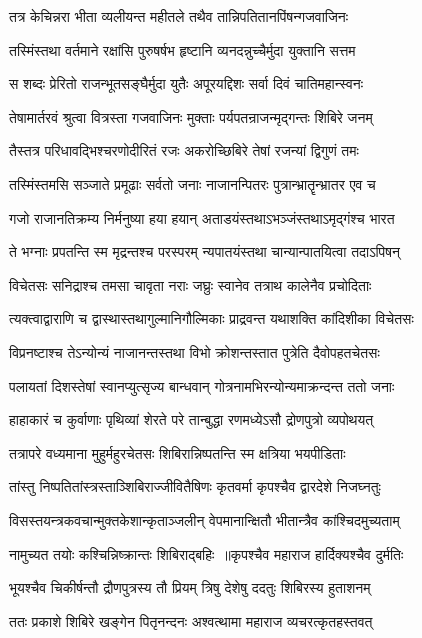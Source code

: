 \twolineshloka
{तत्र केचिन्नरा भीता व्यलीयन्त महीतले}
{तथैव तान्निपतितानपिंषन्गजवाजिनः}


\twolineshloka
{तस्मिंस्तथा वर्तमाने रक्षांसि पुरुषर्षभ}
{हृष्टानि व्यनदन्नुच्चैर्मुदा युक्तानि सत्तम}


\twolineshloka
{स शब्दः प्रेरितो राजन्भूतसङ्घैर्मुदा युतैः}
{अपूरयद्दिशः सर्वा दिवं चातिमहान्स्वनः}


\twolineshloka
{तेषामार्तरवं श्रुत्वा वित्रस्ता गजवाजिनः}
{मुक्ताः पर्यपतन्राजन्मृद्गन्तः शिबिरे जनम्}


\twolineshloka
{तैस्तत्र परिधावद्भिश्चरणोदीरितं रजः}
{अकरोच्छिबिरे तेषां रजन्यां द्विगुणं तमः}


\twolineshloka
{तस्मिंस्तमसि सञ्जाते प्रमूढाः सर्वतो जनाः}
{नाजानन्पितरः पुत्रान्भ्रातॄन्भ्रातर एव च}


\twolineshloka
{गजो राजानतिक्रम्य निर्मनुष्या हया हयान्}
{अताडयंस्तथाऽभञ्जंस्तथाऽमृद्गंश्च भारत}


\twolineshloka
{ते भग्नाः प्रपतन्ति स्म मृद्रन्तश्च परस्परम्}
{न्यपातयंस्तथा चान्यान्पातयित्वा तदाऽपिषन्}


\twolineshloka
{विचेतसः सनिद्राश्च तमसा चावृता नराः}
{जघ्रुः स्वानेव तत्राथ कालेनैव प्रचोदिताः}


\twolineshloka
{त्यक्त्वाद्वाराणि च द्वास्थास्तथागुल्मानिगौल्मिकाः}
{प्राद्रवन्त यथाशक्ति कांदिशीका विचेतसः}


\twolineshloka
{विप्रनष्टाश्च तेऽन्योन्यं नाजानन्तस्तथा विभो}
{क्रोशन्तस्तात पुत्रेति दैवोपहतचेतसः}


\twolineshloka
{पलायतां दिशस्तेषां स्वानप्युत्सृज्य बान्धवान्}
{गोत्रनामभिरन्योन्यमाक्रन्दन्त ततो जनाः}


\twolineshloka
{हाहाकारं च कुर्वाणाः पृथिव्यां शेरते परे}
{तान्बुद्धा रणमध्येऽसौ द्रोणपुत्रो व्यपोथयत्}


\twolineshloka
{तत्रापरे वध्यमाना मुहुर्महुरचेतसः}
{शिबिरान्निष्पतन्ति स्म क्षत्रिया भयपीडिताः}


\twolineshloka
{तांस्तु निष्पतितांस्त्रस्ताञ्शिबिराज्जीवितैषिणः}
{कृतवर्मा कृपश्चैव द्वारदेशे निजघ्नतुः}


\twolineshloka
{विसस्तयन्त्रकवचान्मुक्तकेशान्कृताञ्जलीन्}
{वेपमानान्क्षितौ भीतान्त्रैव कांश्चिदमुच्यताम्}


\twolineshloka
{नामुच्यत तयोः कश्चिन्निष्क्रान्तः शिबिराद्बहिः ॥कृपश्चैव महाराज हार्दिक्यश्चैव दुर्मतिः}
{}


\twolineshloka
{भूयश्चैव चिकीर्षन्तौ द्रौणपुत्रस्य तौ प्रियम्}
{त्रिषु देशेषु ददतुः शिबिरस्य हुताशनम्}


\twolineshloka
{ततः प्रकाशे शिबिरे खङ्गेन पितृनन्दनः}
{अश्वत्थामा महाराज व्यचरत्कृतहस्तवत्}



